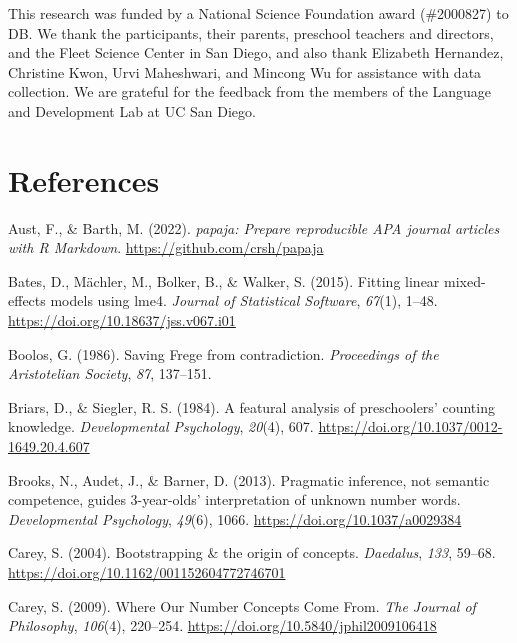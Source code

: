 \documentclass[
  man,floatsintext]{apa7}
\newlength{\cslhangindent}
\newlength{\cslentryspacingunit} %
\newenvironment{CSLReferences}[2] %
 {%
  \setlength{\parindent}{0pt}
  \ifodd #1
  \let\oldpar\par
  \def\par{\hangindent=\cslhangindent\oldpar}
  \fi
  \setlength{\parskip}{#2\cslentryspacingunit}
 }%
 {}
\begin{document}
This research was funded by a National Science Foundation award (\#2000827) to DB. We thank the participants, their parents, preschool teachers and directors, and the Fleet Science Center in San Diego, and also thank Elizabeth Hernandez, Christine Kwon, Urvi Maheshwari, and Mincong Wu for assistance with data collection. We are grateful for the feedback from the members of the Language and Development Lab at UC San Diego.

\newpage

\hypertarget{references}{%
\section{References}\label{references}}

\hypertarget{refs}{}
\begin{CSLReferences}{1}{0}
\leavevmode{}%
Aust, F., \& Barth, M. (2022). \emph{{papaja}: {Prepare} reproducible {APA} journal articles with {R Markdown}}. \url{https://github.com/crsh/papaja}

\leavevmode{}%
Bates, D., Mächler, M., Bolker, B., \& Walker, S. (2015). Fitting linear mixed-effects models using {lme4}. \emph{Journal of Statistical Software}, \emph{67}(1), 1--48. \url{https://doi.org/10.18637/jss.v067.i01}

\leavevmode{}%
Boolos, G. (1986). Saving {Frege} from contradiction. \emph{Proceedings of the Aristotelian Society}, \emph{87}, 137--151.

\leavevmode{}%
Briars, D., \& Siegler, R. S. (1984). A featural analysis of preschoolers' counting knowledge. \emph{Developmental Psychology}, \emph{20}(4), 607. \url{https://doi.org/10.1037/0012-1649.20.4.607}

\leavevmode{}%
Brooks, N., Audet, J., \& Barner, D. (2013). Pragmatic inference, not semantic competence, guides 3-year-olds' interpretation of unknown number words. \emph{Developmental Psychology}, \emph{49}(6), 1066. \url{https://doi.org/10.1037/a0029384}

\leavevmode{}%
Carey, S. (2004). Bootstrapping \& the origin of concepts. \emph{Daedalus}, \emph{133}, 59--68. \url{https://doi.org/10.1162/001152604772746701}

\leavevmode{}%
Carey, S. (2009). Where {Our} {Number} {Concepts} {Come} {From}. \emph{The Journal of Philosophy}, \emph{106}(4), 220--254. \url{https://doi.org/10.5840/jphil2009106418}


\end{CSLReferences}
\end{document}
